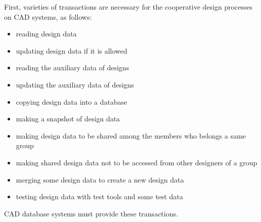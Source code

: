 First, varieties of transactions are necessary for the cooperative design processes 
on CAD systems, as follows:
\begin{itemize}
 \item reading design data%
 \item updating design data if it is allowed%
 \item reading the auxiliary data of designs%
 \item updating the auxiliary data of designs%
 \item copying design data into a database%
 \item making a snapshot of  design data%
 \item making design data to be shared among the members who belongs a
same group%
 \item making shared design data not to be accessed from other designers
of a group%
 \item merging some design data to create a new design data%
 \item testing design data with test tools and some test data%
\end{itemize}
CAD database systems must provide these transactions.

